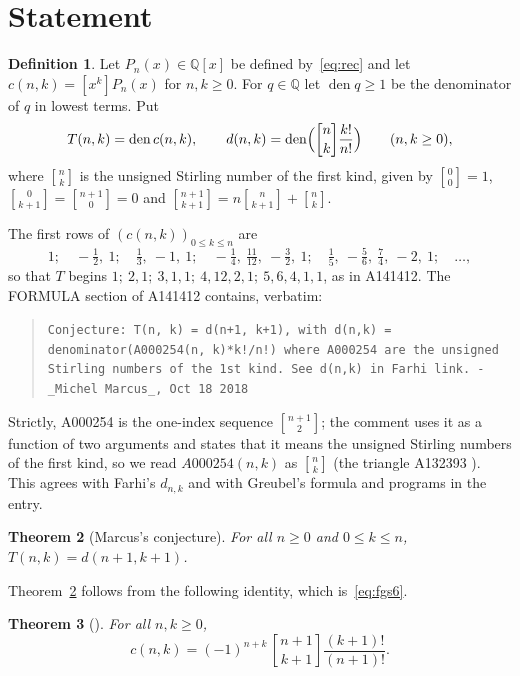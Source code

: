 \documentclass[11pt]{amsart}
\theoremstyle{plain}
\newtheorem{theorem}{Theorem}
\theoremstyle{definition}
\newtheorem{definition}[theorem]{Definition}
\newcommand{\Q}{\mathbb{Q}}
\newcommand{\den}{\operatorname{den}}
\newcommand{\st}[2]{\genfrac{[}{]}{0pt}{}{#1}{#2}}
\begin{document}
\section{Statement}\label{sec:statement}

\begin{definition}\label{def:main}
Let $P_n(x)\in\Q[x]$ be defined by~\eqref{eq:rec} and let $c(n,k)=[x^k]P_n(x)$ for $n,k\ge0$. For $q\in\Q$ let $\den q\ge1$ be the denominator of $q$ in lowest terms. Put
\[
  T(n,k)=\den c(n,k),\qquad d(n,k)=\den\Bigl(\st nk\frac{k!}{n!}\Bigr)\qquad(n,k\ge0),
\]
where $\st nk$ is the unsigned Stirling number of the first kind, given by $\st00=1$, $\st0{k+1}=\st{n+1}0=0$ and
$\st{n+1}{k+1}=n\st n{k+1}+\st nk$.
\end{definition}

The first rows of $(c(n,k))_{0\le k\le n}$ are
\[
  1;\quad -\tfrac12,\ 1;\quad \tfrac13,\ -1,\ 1;\quad -\tfrac14,\ \tfrac{11}{12},\ -\tfrac32,\ 1;\quad \tfrac15,\ -\tfrac56,\ \tfrac74,\ -2,\ 1;\quad\dots,
\]
so that $T$ begins $1;\ 2,1;\ 3,1,1;\ 4,12,2,1;\ 5,6,4,1,1$, as in A141412.
The FORMULA section of A141412 \cite{A141412} contains, verbatim:
\begin{quote}
{\small\raggedright\texttt{Conjecture: T(n, k) = d(n+1, k+1), with d(n,k) = denominator(A000254(n, k)*k!/n!) where A000254 are the unsigned Stirling numbers of the 1st kind. See d(n,k) in Farhi link. - \_Michel Marcus\_, Oct 18 2018}\par}
\end{quote}
Strictly, A000254 \cite{A000254} is the one-index sequence $\st{n+1}2$; the comment uses it as a function of two arguments and states that it means the unsigned Stirling numbers of the first kind, so we read $A000254(n,k)$ as $\st nk$ (the triangle A132393 \cite{A132393}). This agrees with Farhi's $d_{n,k}$ and with Greubel's formula and programs in the entry.

\begin{theorem}[Marcus's conjecture]\label{thm:main}
For all $n\ge0$ and $0\le k\le n$, $T(n,k)=d(n+1,k+1)$.
\end{theorem}

Theorem~\ref{thm:main} follows from the following identity, which is~\eqref{eq:fgs6}.

\begin{theorem}[{\cite[eq.~(6)]{FGS}}]\label{thm:coef}
For all $n,k\ge0$,
\[
  c(n,k)=(-1)^{n+k}\,\st{n+1}{k+1}\frac{(k+1)!}{(n+1)!}.
\]
\end{theorem}
\end{document}
